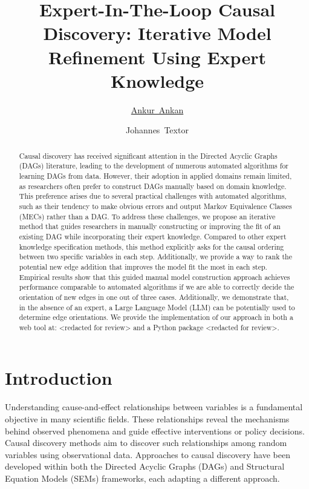 \documentclass{uai2025} %
\title{Expert-In-The-Loop Causal Discovery: Iterative Model Refinement Using Expert Knowledge}
\author[1]{\href{mailto:<ankur.ankan@ru.nl>?Subject=Your UAI 2025 paper}{Ankur~Ankan}{}}
\author[1]{Johannes~Textor}
\affil[1]{%
    Institute for Computing and Information Sciences\\
    Radboud University\\
    Nijmegen, The Netherlands
}
\begin{document}
\maketitle

\begin{abstract}

Causal discovery has received significant attention in the Directed Acyclic
Graphs (DAGs) literature, leading to the development of numerous automated
algorithms for learning DAGs from data. However, their adoption in applied
domains remain limited, as researchers often prefer to construct DAGs manually
based on domain knowledge. This preference arises due to several practical
challenges with automated algorithms, such as their tendency to make obvious
errors and output Markov Equivalence Classes (MECs) rather than a DAG. To
address these challenges, we propose an iterative method that guides
researchers in manually constructing or improving the fit of an existing DAG
while incorporating their expert knowledge. Compared to other expert knowledge
specification methods, this method explicitly asks for the causal ordering
between two specific variables in each step. Additionally, we provide a way to
rank the potential new edge addition that improves the model fit the most in
each step. Empirical results show that this guided manual model construction
approach achieves performance comparable to automated algorithms if we are able
to correctly decide the orientation of new edges in one out of three cases.
Additionally, we demonstrate that, in the absence of an expert, a Large
Language Model (LLM) can be potentially used to determine edge orientations. We
provide the implementation of our approach in both a web tool at: <redacted for
review> and a Python package <redacted for review>.




\end{abstract}

\section{Introduction}
Understanding cause-and-effect relationships between variables is a fundamental
objective in many scientific fields. These relationships reveal the mechanisms
behind observed phenomena and guide effective interventions or policy
decisions. Causal discovery methods aim to discover such relationships
among random variables using observational data. Approaches to causal discovery
have been developed within both the Directed Acyclic Graphs (DAGs) and
Structural Equation Models (SEMs) frameworks, each adapting a different
approach.
\end{document}
